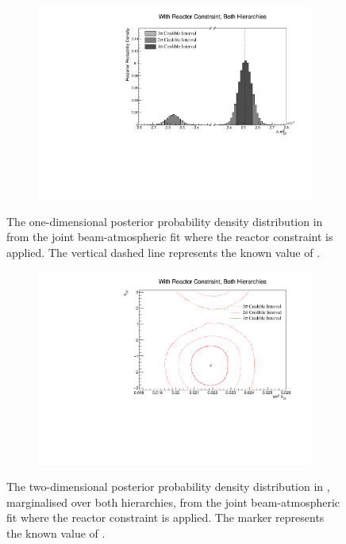 \begin{figure}[h]
  \begin{subfigure}[t]{0.98\textwidth}
    \includegraphics[width=\textwidth, trim={0mm 0mm 0mm 0mm}, clip,page=1]{Figures/OA/JointFit_wRC/Contours_1D_dm32_BH_1_wRC_UnSmeared_CredibleInterval.pdf}
  \end{subfigure}
  \caption{The one-dimensional posterior probability density distribution in  from the joint beam-atmospheric fit where the reactor constraint is applied. The vertical dashed line represents the known value of .}
  \label{fig:OscillationAnalysis_JointFit_wRC_DM32}
\end{figure}

\begin{figure}[h]
  \begin{subfigure}[t]{0.98\textwidth}
    \includegraphics[width=\textwidth, trim={0mm 0mm 0mm 0mm}, clip,page=1]{Figures/OA/JointFit_wRC/Contours_2D_th13_dcp_BH_1_wRC_UnSmeared_CredibleInterval.pdf}
  \end{subfigure}
  \caption{The two-dimensional posterior probability density distribution in , marginalised over both hierarchies, from the joint beam-atmospheric fit where the reactor constraint is applied. The marker represents the known value of .}
  \label{fig:OscillationAnalysis_JointFit_wRC_TH13DCP}
\end{figure}

